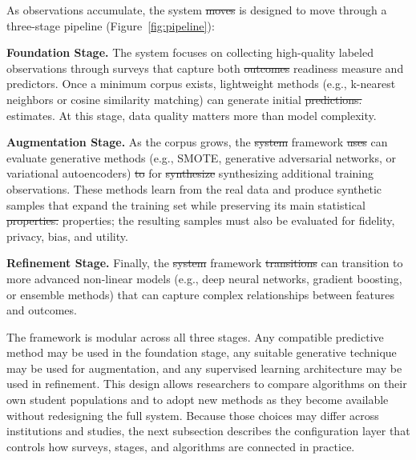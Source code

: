 \documentclass[letterpaper,11pt]{article}
\newcommand{\DIFdel}[1]{%
  \begingroup\setlength{\fboxsep}{0.5pt}%
  \colorbox{diffdelbg}{\textcolor{diffdeltext}{\sout{#1}}}%
  \endgroup}
\newcommand{\DIFadd}[1]{%
  \begingroup\setlength{\fboxsep}{0.5pt}%
  \colorbox{diffaddbg}{\textcolor{diffaddtext}{#1}}%
  \endgroup}
\begin{document}
As observations accumulate, the system \DIFdel{moves} \DIFadd{is} \DIFadd{designed} \DIFadd{to} \DIFadd{move} through a three-stage pipeline (Figure~\ref{fig:pipeline}):

\textbf{Foundation Stage.} The system focuses on collecting high-quality labeled observations through surveys that capture both \DIFdel{outcomes} \DIFadd{readiness} \DIFadd{measure} and predictors. Once a minimum corpus exists, lightweight methods (e.g., k-nearest neighbors or cosine similarity matching) can generate initial \DIFdel{predictions.} \DIFadd{estimates.} At this stage, data quality matters more than model complexity.

\textbf{Augmentation Stage.} As the corpus grows, the \DIFdel{system} \DIFadd{framework} \DIFdel{uses} \DIFadd{can} \DIFadd{evaluate} generative methods (e.g., SMOTE, generative adversarial networks, or variational autoencoders) \DIFdel{to} \DIFadd{for} \DIFdel{synthesize} \DIFadd{synthesizing} additional training observations. These methods learn from the real data and produce synthetic samples that expand the training set while preserving its main statistical \DIFdel{properties.} \DIFadd{properties;} \DIFadd{the} \DIFadd{resulting} \DIFadd{samples} \DIFadd{must} \DIFadd{also} \DIFadd{be} \DIFadd{evaluated} \DIFadd{for} \DIFadd{fidelity,} \DIFadd{privacy,} \DIFadd{bias,} \DIFadd{and} \DIFadd{utility.}

\textbf{Refinement Stage.} Finally, the \DIFdel{system} \DIFadd{framework} \DIFdel{transitions} \DIFadd{can} \DIFadd{transition} to more advanced non-linear models (e.g., deep neural networks, gradient boosting, or ensemble methods) that can capture complex relationships between features and outcomes.

The framework is modular across all three stages. Any compatible predictive method may be used in the foundation stage, any suitable generative technique may be used for augmentation, and any supervised learning architecture may be used in refinement. This design allows researchers to compare algorithms on their own student populations and to adopt new methods as they become available without redesigning the full system. Because those choices may differ across institutions and studies, the next subsection describes the configuration layer that controls how surveys, stages, and algorithms are connected in practice.
\end{document}
